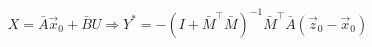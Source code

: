 \documentclass{article}
\begin{document}
\thispagestyle{empty}

$$
X = \bar{A} \vec{x}_0 + \bar{B} U \Rightarrow
Y^* = -(I + \bar{M}^\top\bar{M})^{-1}\bar{M}^\top\bar{A}(\vec{z}_0 - \vec{x}_0)
$$
\end{document}
